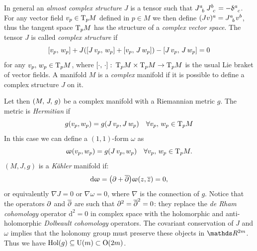 In general an \emph{almost complex structure} $J$ is a tensor such that $\tensor{J}{^a_b}\, \tensor{J}{^b_c} = - \tensor{\delta}{^a_c}$.
For any vector field $v_p \in \mathrm{T}_p M$ defined in $p \in M$ we then define $(J v)^a = \tensor{J}{^a_b} v^b$, thus the tangent space $\mathrm{T}_p M$ has the structure of a \emph{complex vector space}.
The tensor $J$ is called \emph{complex structure} if
\begin{equation}
  \left[ v_p,\, w_p \right]
  +
  J
  \qty( \left[ J\, v_p,\, w_p \right] + \left[ v_p,\, J\, w_p \right] )
  -
  \left[ J\, v_p,\, J\, w_p \right]
  =
  0
\end{equation}
for any $v_p,\, w_p \in \mathrm{T}_p M$, where $\left[ \cdot,\, \cdot \right]\colon\, \mathrm{T}_p M \times \mathrm{T}_p M \to \mathrm{T}_p M$ is the usual Lie braket of vector fields.
A manifold $M$ is a \emph{complex} manifold if it is possible to define a complex structure $J$ on it.\footnotemark{}

Let then $\qty(M,\, J,\, g)$ be a complex manifold with a Riemannian metric $g$.
The metric is \emph{Hermitian} if
\begin{equation}
  g( v_p, w_p ) = g( J\, v_p, J\, w_p )
  \quad
  \forall v_p,\, w_p \in \mathrm{T}_p M
\end{equation}
In this case we can define a $(1, 1)$-form $\omega$ as
\begin{equation}
  \upomega( v_p, w_p )
  =
  g( J\, v_p, w_p )
  \quad
  \forall v_p,\, w_p \in \mathrm{T}_p M.
\end{equation}
$(M, J, g)$ is a \emph{Kähler} manifold if:
\begin{equation}
  \dd{\ensuremath{\upomega}}
  =
  \qty( \partial + \overline{\partial} )
  \upomega(z, \overline{z})
  =
  0,
  \label{eq:cy:kaehler}
\end{equation}
or equivalently $\nabla J = 0$ or $\nabla \omega = 0$, where $\nabla$ is the connection of $g$.
Notice that the operators $\partial$ and $\overline{\partial}$ are such that $\partial^2 = \overline{\partial}^2 = 0$: they replace the \emph{de Rham cohomology} operator $\mathrm{d}^2 = 0$ in complex space with the holomorphic and anti-holomorphic \emph{Dolbeault cohomology} operators.
The covariant conservation of $J$ and $\omega$ implies that the holonomy group must preserve these objects in $\R^{2m}$.
Thus we have $\mathrm{Hol}(g) \subseteq \mathrm{U}(m) \subset \mathrm{O}(2m)$.


